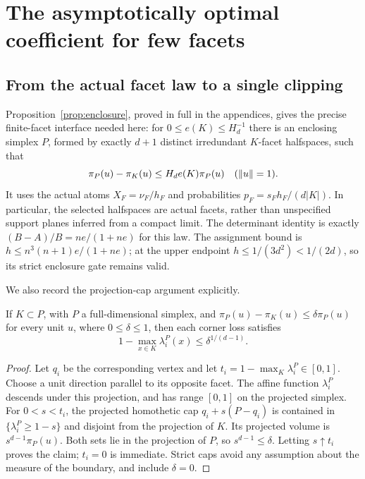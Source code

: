 \section{The asymptotically optimal coefficient for few facets}\label{sec:few}
\subsection{From the actual facet law to a single clipping}
Proposition~\ref{prop:enclosure}, proved in full in the appendices, gives
the precise finite-facet interface needed here: for
$0\le e(K)\le H_d^{-1}$ there is an enclosing simplex $P$, formed by
exactly $d+1$ distinct irredundant $K$-facet halfspaces, such that
\begin{equation}\label{eq:facet-proj}
 \pi_P(u)-\pi_K(u)\le H_de(K)\pi_P(u)\quad(\lVert u\rVert=1).
\end{equation}
It uses the actual atoms $X_F=\nu_F/h_F$ and probabilities
$p_F=s_Fh_F/(d|K|)$. In particular, the selected halfspaces are actual
facets, rather than unspecified support planes inferred from a compact
limit. The determinant identity is exactly
$(B-A)/B=ne/(1+ne)$ for this law. The assignment bound is
$h\le n^3(n+1)e/(1+ne)$; at the upper endpoint
$h\le1/(3d^2)<1/(2d)$, so its strict enclosure gate remains valid.

We also record the projection-cap argument explicitly.
\begin{lemma}\label{lem:cap}
If $K\subset P$, with $P$ a full-dimensional simplex, and
$\pi_P(u)-\pi_K(u)\le\delta\pi_P(u)$ for every unit $u$, where
$0\le\delta\le1$, then each corner loss satisfies
\[
 1-\max_{x\in K}\lambda_i^P(x)\le\delta^{1/(d-1)}.
\]
\end{lemma}
\begin{proof}
Let $q_i$ be the corresponding vertex and let
$t_i=1-\max_K\lambda_i^P\in[0,1]$. Choose a unit direction parallel to
its opposite facet. The affine function $\lambda_i^P$ descends under
this projection, and has range $[0,1]$ on the projected simplex.
For $0<s<t_i$, the projected homothetic cap $q_i+s(P-q_i)$ is contained
in $\{\lambda_i^P\ge1-s\}$ and disjoint from the projection of $K$.
Its projected volume is $s^{d-1}\pi_P(u)$. Both sets lie in the
projection of $P$, so $s^{d-1}\le\delta$. Letting $s\uparrow t_i$
proves the claim; $t_i=0$ is immediate. Strict caps avoid any assumption
about the measure of the boundary, and include $\delta=0$.
\end{proof}

